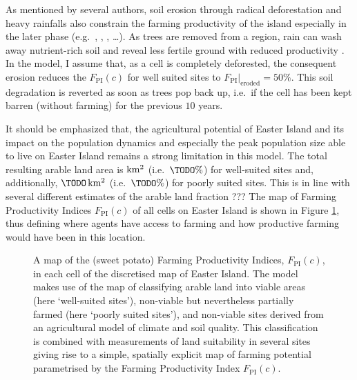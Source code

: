 As mentioned by several authors, soil erosion through radical deforestation and heavy rainfalls also constrain the farming productivity of the island especially in the later phase (e.g.\ \citet{Brander1998}, \citet{Mieth2005}, \citet{Bahn2017}, \ldots).
As trees are removed from a region, rain can wash away nutrient-rich soil and reveal less fertile ground with reduced productivity \citet{Mieth2005}.
In the model, I assume that, as a cell is completely deforested, the consequent erosion reduces the $F_\text{PI}(c)$ for well suited sites to $F_\text{PI}|_\text{eroded}=50\%$. 
This soil degradation is reverted as soon as trees pop back up, i.e.\ if the cell has been kept barren (without farming) for the previous $10$ years.

It should be emphasized that, the agricultural potential of Easter Island and its impact on the population dynamics and especially the peak population size able to live on Easter Island remains a strong limitation in this model. %
The total resulting arable land area is \TODO $\rm{km^2}$ (i.e.\ $\TODO\%$) for well-suited sites and, additionally, $\TODO\, \rm{km^2}$ (i.e.\ $\TODO\%$) for poorly suited sites.
This is in line with several different estimates of the arable land fraction \TODO \citet{Bahn2017}???
The map of Farming Productivity Indices $F_\text{PI}(c)$ of all cells on Easter Island is shown in Figure \ref{fig:Map_agric}, thus defining where agents have access to farming and how productive farming would have been in this location. 

\begin{figure}
	\centering
	\caption{A map of the (sweet potato) Farming Productivity Indices, $F_\text{PI}(c)$, in each cell of the discretised map of Easter Island. The model makes use of the map of \citet{Pulestion2017} classifying arable land into viable areas (here `well-suited sites'), non-viable but nevertheless partially farmed (here `poorly suited sites'), and non-viable sites derived from an agricultural model of climate and soil quality. 
	This classification is combined with measurements of land suitability in several sites \citep{Louwagie2006} giving rise to a simple, spatially explicit map of farming potential parametrised by the Farming Productivity Index $F_\text{PI}(c)$.}
	\label{fig:Map_agric}
\end{figure}


